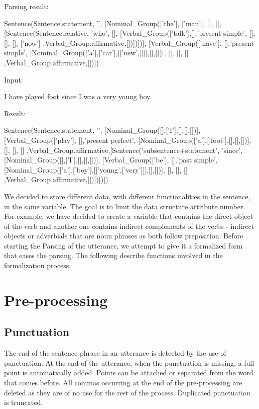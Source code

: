 \documentclass[twoside,a4paper,10pt]{report}
\newcommand{\dokutitlelevelone}[1]{} %
\newcommand{\dokutitleleveltwo}[1]{\chapter{#1}}
\newcommand{\dokutitleleveltree}[1]{\section{#1}}
\begin{document}
Parsing result:


\small
\begin{verbatimtab}
  Sentence(Sentence.statement, '', 
      [Nominal_Group(['the'], ['man'], [], [],[Sentence(Sentence.relative, 'who', 
          [],  
          [Verbal_Group(['talk'],[],'present simple', 
              [], 
              [],
              [], ['now'] ,Verbal_Group.affirmative,[])])])],  
      [Verbal_Group(['have'], [],'present simple', 
          [Nominal_Group(['a'],['car'],[['new',[]]],[],[])],
          [],
          [], [] ,Verbal_Group.affirmative,[])])
\end{verbatimtab}
\normalsize

Input:


\small
\begin{verbatimtab}
I have played foot since I was a very young boy.
\end{verbatimtab}
\normalsize
Result:


\small
\begin{verbatimtab}
  Sentence(Sentence.statement, '', 
      [Nominal_Group([],['I'],[],[],[])], 
      [Verbal_Group(['play'], [],'present perfect', 
          [Nominal_Group(['a'],['foot'],[],[],[])], 
          [],
          [], [] ,Verbal_Group.affirmative,[Sentence('subsentence+statement', 'since', 
              [Nominal_Group([],['I'],[],[],[])], 
              [Verbal_Group(['be'], [],'past simple', 
                  [Nominal_Group(['a'],['boy'],[['young',['very']]],[],[])], 
                  [],
                  [], [] ,Verbal_Group.affirmative,[])])])])
\end{verbatimtab}
\normalsize

\dokutitlelevelone{Natural Language Parsing}
\label{40b6d909561b858c733e07e5b7595576}%
We decided to store different data, with different functionalities in the sentence, in the same variable. The goal is to limit the data structure attribute number.
For example, we have decided to create a variable that contains the direct object of the verb and another one contains indirect complements of the verbs - indirect objects or adverbials that are noun phrases as both follow preposition.
Before starting the Parsing of the utterance, we attempt to give it a formalized form that eases the parsing. The following describe functions involved in the formalization process.


\dokutitleleveltwo{Pre-processing}
\label{786dd9bb7bc5625a566d42a2962bebf7}%

\dokutitleleveltree{Punctuation}
\label{9ac6d441030eb0844ffb83ba4f100c94}%
The end of the sentence phrase in an utterance is detected by the use of punctuation. At the end of the utterance, when the punctuation is missing, a full point is automatically added. Points can be attached or separated from the word that comes before.
All commas occurring at the end of the pre-processing are deleted as they are of no use for the rest of the process.
Duplicated punctuation is truncated.
\end{document}
